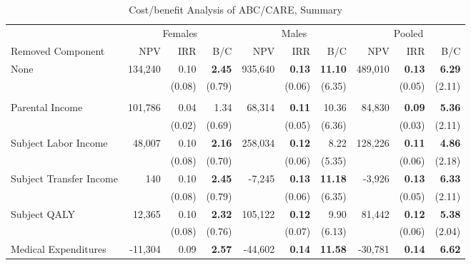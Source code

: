 \documentclass[static]{JJH-Beamer}
\newcommand{\mc}{\multicolumn}
\begin{document}
\begin{frame}[shrink=10]

\begin{table}[H]
\caption{Cost/benefit Analysis of ABC/CARE, Summary}\label{table:cba}
\begin{center}
\begin{tabular}{l r r r r r r r r r}																			
\toprule																			
&       \mc{3}{c}{Females}      &       \mc{3}{c}{Males}        &       \mc{3}{c}{Pooled}       \\																			
\cmidrule(lr){2-4}      \cmidrule(lr){5-7}      \cmidrule(lr){8-10}																			
Removed Component       &       NPV     &       IRR     &       B/C     &       NPV     &       IRR     &       B/C     &       NPV     &       IRR     &       B/C     \\																			
\midrule																			
None	&	134,240	&	0.10	&	\textbf{2.45}	&	935,640	&	\textbf{0.13}	&	\textbf{11.10}	&	489,010	&	\textbf{0.13}	&	\textbf{6.29}	\\
	&		&	(0.08)	&	(0.79)	&		&	(0.06)	&	(6.35)	&		&	(0.05)	&	(2.11)	\\ \\
Parental Income	&	101,786	&	0.04	&	1.34	&	68,314	&	\textbf{0.11}	&	10.36	&	84,830	&	\textbf{0.09}	&	\textbf{5.36}	\\
	&		&	(0.02)	&	(0.69)	&		&	(0.05)	&	(6.36)	&		&	(0.03)	&	(2.11)	\\
Subject Labor Income	&	48,007	&	0.10	&	\textbf{2.16}	&	258,034	&	\textbf{0.12}	&	8.22	&	128,226	&	\textbf{0.11}	&	\textbf{4.86}	\\
	&		&	(0.08)	&	(0.70)	&		&	(0.06)	&	(5.35)	&		&	(0.06)	&	(2.18)	\\
Subject Transfer Income	&	140	&	0.10	&	\textbf{2.45}	&	-7,245	&	\textbf{0.13}	&	\textbf{11.18}	&	-3,926	&	\textbf{0.13}	&	\textbf{6.33}	\\
	&		&	(0.08)	&	(0.79)	&		&	(0.06)	&	(6.35)	&		&	(0.05)	&	(2.11)	\\
Subject QALY	&	12,365	&	0.10	&	\textbf{2.32}	&	105,122	&	\textbf{0.12}	&	9.90	&	81,442	&	\textbf{0.12}	&	\textbf{5.38}	\\
	&		&	(0.08)	&	(0.76)	&		&	(0.07)	&	(6.13)	&		&	(0.06)	&	(2.04)	\\
Medical Expenditures	&	-11,304	&	0.09	&	\textbf{2.57}	&	-44,602	&	\textbf{0.14}	&	\textbf{11.58}	&	-30,781	&	\textbf{0.14}	&	\textbf{6.62}	\\

\end{tabular}
\end{center}
\end{table}
\end{frame}
\end{document}
